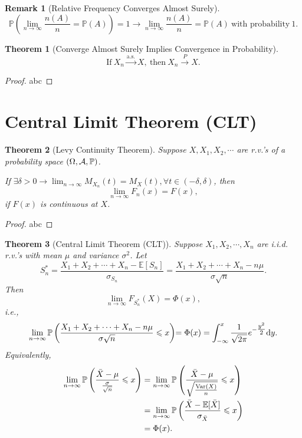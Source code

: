 \documentclass[openany,12pt]{book}
\newtheorem{theorem}{Theorem}[chapter]
\newtheorem{remark}{Remark}[chapter]
\begin{document}
\begin{remark}[Relative Frequency Converges Almost Surely]
  \[\mathbb{P}\left( \lim_{n \to \infty}\frac{n( A)}{n} = \mathbb{P}(A) \right)= 1  \to  \lim_{n \to \infty}\frac{n( A)}{n} = \mathbb{P}( A) ~\text{with probability}~ 1.\]
\end{remark}

\begin{theorem}[Converge Almost Surely Implies Convergence in Probability]
  \[\text{If}~X_{n}\xrightarrow{\text{a.s.}}X,~\text{then}~X_{n}\xrightarrow{ P }X.\]
\end{theorem}

\begin{proof}
  abc
\end{proof}

\section{Central Limit Theorem (CLT)}

\begin{theorem}[Levy Continuity Theorem]
  Suppose $X,X_{1}, X_{2}, \cdots$ are r.v.'s of a probability space $(\Omega,\mathcal{A},\mathbb{P})$.

  If $\exists\delta > 0  \to  \lim_{n \to \infty}{M_{X_{n}}(t)} = M_{X}(t), \forall t \in \left( - \delta,\delta \right)$, then
  \[
    \lim_{n \to \infty}F_{n}(x)= F(x),
  \]
  if $F(x)$ is continuous at $X$.
\end{theorem}

\begin{proof}
  abc
\end{proof}

\begin{theorem}[Central Limit Theorem (CLT)]
  Suppose $X_{1}, X_{2}, \cdots,X_{n}$ are i.i.d. r.v.'s with mean $\mu$ and variance $\sigma^{2}$. Let
  \[S_{n}^{*} = \frac{X_{1} + X_{2} + \cdots + X_{n} - \mathbb{E}[S_{n}]}{\sigma_{S_{n}}} = \frac{X_{1} + X_{2} + \cdots + X_{n} - n\mu}{\sigma\sqrt{n}}.\]
  Then
  \[\lim_{n \to \infty}{F_{S_{n}^{*}}(X)= \Phi(x)},\]
  i.e.,
  \[{\lim_{n \to \infty}\mathbb{P}\left( \frac{X_{1} + X_{2} + \cdots + X_{n} - n\mu}{\sigma\sqrt{n}} \leqslant x \right)}{= \Phi(x)} = \int_{- \infty}^{x}\frac{1}{\sqrt{2\pi}}e^{- \tfrac{y^{2}}{2}}\mathrm{d} y.\]
  Equivalently,
  \[\begin{aligned}
      {\lim_{n \to \infty}\mathbb{P}\left( \frac{\bar{X} - \mu}{\frac{\sigma}{\sqrt{n}}} \leqslant x \right)} & = \lim_{n \to \infty}\mathbb{P}\left( \frac{\bar{X} - \mu}{\sqrt{\frac{\mathrm{Var}(X)}{n}}} \leqslant x \right) \\
                                                                                                        & = \lim_{n \to \infty}\mathbb{P}\left( \frac{\bar{X} - \mathbb{E}[\bar{X}]}{\sigma_{\bar{X}}} \leqslant x \right) \\
                                                                                                        & = \Phi(x).                                                                                                 \\
    \end{aligned}\]
\end{theorem}
\end{document}
